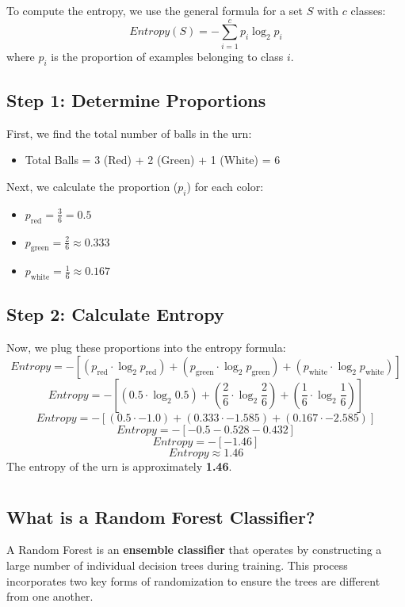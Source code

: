 \documentclass[a4paper,12pt]{article}
\begin{document}
To compute the entropy, we use the general formula for a set $S$ with $c$ classes:
$$
Entropy(S) = -\sum_{i=1}^{c} p_{i} \log_{2} p_{i}
$$
where $p_i$ is the proportion of examples belonging to class $i$.

\subsection{Step 1: Determine Proportions}
First, we find the total number of balls in the urn:
\begin{itemize}
    \item Total Balls = 3 (Red) + 2 (Green) + 1 (White) = 6
\end{itemize}

Next, we calculate the proportion ($p_i$) for each color:
\begin{itemize}
    \item $p_{\text{red}} = \frac{3}{6} = 0.5$
    \item $p_{\text{green}} = \frac{2}{6} \approx 0.333$
    \item $p_{\text{white}} = \frac{1}{6} \approx 0.167$
\end{itemize}

\subsection{Step 2: Calculate Entropy}
Now, we plug these proportions into the entropy formula:
$$
Entropy = - [ (p_{\text{red}} \cdot \log_{2} p_{\text{red}}) + (p_{\text{green}} \cdot \log_{2} p_{\text{green}}) + (p_{\text{white}} \cdot \log_{2} p_{\text{white}}) ]
$$
$$
Entropy = - [ (0.5 \cdot \log_{2} 0.5) + (\frac{2}{6} \cdot \log_{2} \frac{2}{6}) + (\frac{1}{6} \cdot \log_{2} \frac{1}{6}) ]
$$
$$
Entropy = - [ (0.5 \cdot -1.0) + (0.333 \cdot -1.585) + (0.167 \cdot -2.585) ]
$$
$$
Entropy = - [ -0.5 - 0.528 - 0.432 ]
$$
$$
Entropy = - [ -1.46 ]
$$
$$
Entropy \approx 1.46
$$
The entropy of the urn is approximately \textbf{1.46}.



\section{}

\subsection{What is a Random Forest Classifier?}
A Random Forest is an \textbf{ensemble classifier} that operates by constructing a large number of individual decision trees during training. This process incorporates two key forms of randomization to ensure the trees are different from one another. 
\end{document}
